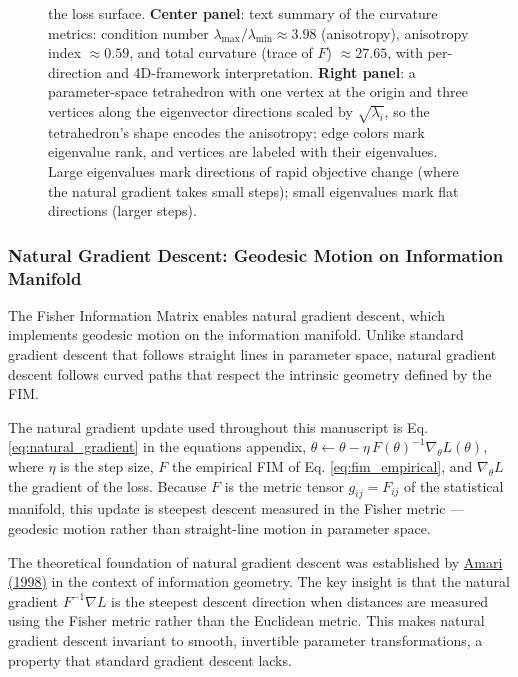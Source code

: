 \documentclass[
  10pt,
]{article}
\begin{document}
\begin{figure}
{the loss surface. \textbf{Center panel}: text summary of the curvature
metrics: condition number \(\lambda_{\max}/\lambda_{\min} \approx 3.98\)
(anisotropy), anisotropy index \(\approx 0.59\), and total curvature
(trace of \(F\)) \(\approx 27.65\), with per-direction and 4D-framework
interpretation. \textbf{Right panel}: a parameter-space tetrahedron with
one vertex at the origin and three vertices along the eigenvector
directions scaled by \(\sqrt{\lambda_i}\), so the tetrahedron's shape
encodes the anisotropy; edge colors mark eigenvalue rank, and vertices
are labeled with their eigenvalues. Large eigenvalues mark directions of
rapid objective change (where the natural gradient takes small steps);
small eigenvalues mark flat directions (larger steps).}
\end{figure}

\subsubsection{Natural Gradient Descent: Geodesic Motion on Information
Manifold}\label{natural-gradient-descent-geodesic-motion-on-information-manifold}

The Fisher Information Matrix enables natural gradient descent, which
implements geodesic motion on the information manifold. Unlike standard
gradient descent that follows straight lines in parameter space, natural
gradient descent follows curved paths that respect the intrinsic
geometry defined by the FIM.

The natural gradient update used throughout this manuscript is Eq.
\eqref{eq:natural_gradient} in the equations appendix,
\(\theta \leftarrow \theta - \eta\, F(\theta)^{-1} \nabla_\theta L(\theta)\),
where \(\eta\) is the step size, \(F\) the empirical FIM of Eq.
\eqref{eq:fim_empirical}, and \(\nabla_\theta L\) the gradient of the
loss. Because \(F\) is the metric tensor \(g_{ij} = F_{ij}\) of the
statistical manifold, this update is steepest descent measured in the
Fisher metric --- geodesic motion rather than straight-line motion in
parameter space.

The theoretical foundation of natural gradient descent was established
by \href{https://en.wikipedia.org/wiki/Natural_gradient}{Amari (1998)}
in the context of information geometry. The key insight is that the
natural gradient \(F^{-1}\nabla L\) is the steepest descent direction
when distances are measured using the Fisher metric rather than the
Euclidean metric. This makes natural gradient descent invariant to
smooth, invertible parameter transformations, a property that standard
gradient descent lacks.
\end{document}
